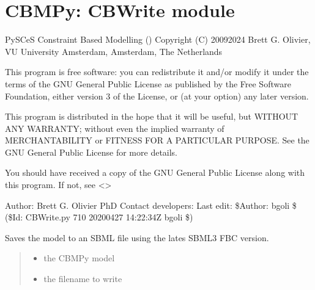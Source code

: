 \documentclass[letterpaper,12pt,english]{sphinxmanual}
\begin{document}
\section{CBMPy: CBWrite module}
\label{\detokenize{api/io:cbmpy-cbwrite-module}}
\sphinxAtStartPar
PySCeS Constraint Based Modelling ()
Copyright (C) 2009\sphinxhyphen{}2024 Brett G. Olivier, VU University Amsterdam, Amsterdam, The Netherlands

\sphinxAtStartPar
This program is free software: you can redistribute it and/or modify
it under the terms of the GNU General Public License as published by
the Free Software Foundation, either version 3 of the License, or
(at your option) any later version.

\sphinxAtStartPar
This program is distributed in the hope that it will be useful,
but WITHOUT ANY WARRANTY; without even the implied warranty of
MERCHANTABILITY or FITNESS FOR A PARTICULAR PURPOSE.  See the
GNU General Public License for more details.

\sphinxAtStartPar
You should have received a copy of the GNU General Public License
along with this program.  If not, see \textless{}\textgreater{}

\sphinxAtStartPar
Author: Brett G. Olivier PhD
Contact developers: 
Last edit: \$Author: bgoli \$ (\$Id: CBWrite.py 710 2020\sphinxhyphen{}04\sphinxhyphen{}27 14:22:34Z bgoli \$)


\begin{fulllineitems}

\pysigstartsignatures
\pysiglinewithargsret
{}
{\sphinxparamcomma {}\sphinxparamcomma {}}
{}
\pysigstopsignatures
\sphinxAtStartPar
Saves the model to an SBML file using the lates SBML3 FBC version.
\begin{quote}\begin{description}
\begin{itemize}
\item {} 
\sphinxAtStartPar
{} \textendash{} the CBMPy model

\item {} 
\sphinxAtStartPar
{} \textendash{} the filename to write

\end{itemize}

\end{description}\end{quote}

\end{fulllineitems}
\end{document}
